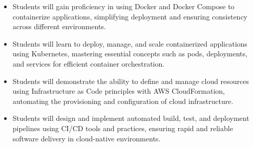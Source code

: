 \begin{itemize}
    \item Students will gain proficiency in using Docker and Docker Compose to containerize applications, simplifying deployment and ensuring consistency across different environments.
    \item Students will learn to deploy, manage, and scale containerized applications using Kubernetes, mastering essential concepts such as pods, deployments, and services for efficient container orchestration.
    \item Students will demonstrate the ability to define and manage cloud resources using Infrastructure as Code principles with AWS CloudFormation, automating the provisioning and configuration of cloud infrastructure.
    \item Students will design and implement automated build, test, and deployment pipelines using CI/CD tools and practices, ensuring rapid and reliable software delivery in cloud-native environments.
\end{itemize}
